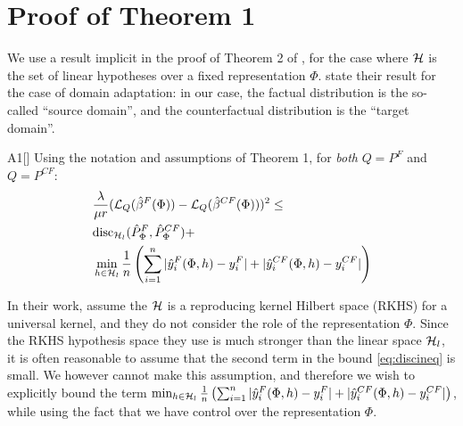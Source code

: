 \appendix
\section{Proof of Theorem 1}\label{app:proof}
We use a result implicit in the proof of Theorem 2 of \citet{cortes2014domain}, for the case where $\mathcal{H}$ is the set of linear hypotheses over a fixed representation $\Phi$. \citet{cortes2014domain} state their result for the case of domain adaptation: in our case, the factual distribution is the so-called ``source domain'', and the counterfactual distribution is the ``target domain''.
\begin{customthm}{A1}\label{thrmA1}[\citet{cortes2014domain}]
Using the notation and assumptions of Theorem 1, for \emph{both} $Q = P^F$ and $Q=P^{CF}$:
\begin{align}\label{eq:discineq}
&\frac{\lambda}{\mu r} (\mathcal{L}_{Q}(\hat{\beta}^F(\Phi))-\mathcal{L}_{Q}(\hat{\beta}^{CF}(\Phi)))^2 \leq \nonumber \\
& \text{disc}_{\mathcal{H}_l}(\hat{P}_\Phi^{F},\hat{P}_\Phi^{CF})  + \nonumber \\
& \min_{h\in \mathcal{H}_l} \frac{1}{n} \left( \sum_{i=1}^n | \hat{y}_i^F(\Phi,h)- y_i^F |  + |\hat{y}_i^{CF}(\Phi,h)  - y_i^{CF}|\right)
\end{align}
\end{customthm}

In their work, \citet{cortes2014domain} assume the $\mathcal{H}$ is a reproducing kernel Hilbert space (RKHS) for a universal kernel, and they do not consider the role of the representation $\Phi$. Since the RKHS hypothesis space they use is much stronger than the linear space $\mathcal{H}_l$, it is often reasonable to assume that the second term in the bound \ref{eq:discineq} is small. We however cannot make this assumption, and therefore we wish to explicitly bound the term $\min_{h\in \mathcal{H}_l} \frac{1}{n} \left( \sum_{i=1}^n | \hat{y}_i^F(\Phi,h)- y_i^F |  + |\hat{y}_i^{CF}(\Phi,h)  - y_i^{CF}|\right)$, while using the fact that we have control over the representation $\Phi$.

